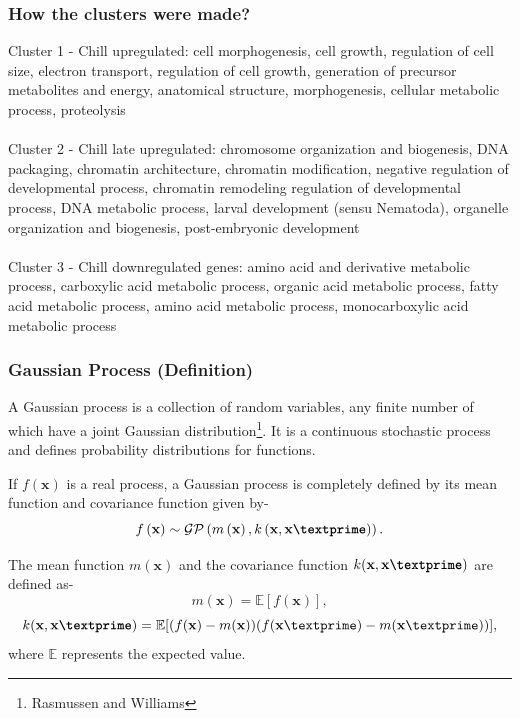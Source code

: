 \documentclass{beamer}
\begin{document}

\begin{frame}

\frametitle{How the clusters were made?}

{\color{red} Cluster 1} - {\color{blue} Chill upregulated:}  
cell morphogenesis, cell growth, regulation of cell size, electron transport, regulation of cell growth, generation of precursor metabolites and energy, anatomical structure,  morphogenesis, cellular metabolic process, proteolysis\\~\\

{\color{red}Cluster 2} - {\color{blue} Chill late upregulated:}
chromosome organization and biogenesis, DNA packaging, chromatin architecture, chromatin modification, negative regulation of developmental process, chromatin remodeling regulation of developmental process, DNA metabolic process, larval development (sensu Nematoda), organelle organization and biogenesis, post-embryonic development\\~\\

{\color{red} Cluster 3} - {\color{blue} Chill downregulated genes:} 
amino acid and derivative metabolic process, carboxylic acid metabolic process, organic acid metabolic process, fatty acid metabolic process, amino acid metabolic process, monocarboxylic acid metabolic process

\end{frame}

\begin{frame}
\frametitle{Gaussian Process (Definition)}
A Gaussian process is a collection of random variables, any finite number of which have a joint Gaussian distribution\footnote{Rasmussen and Williams}. It is a continuous stochastic process and defines probability distributions for functions.

If $f(\textbf{x})$ is a real process, a Gaussian process is completely defined by its mean function and covariance function given by-
\begin{equation} \label{eq:GP}
f\left(\textbf{x} \right)\sim \mathcal{GP} \left(m \left(\textbf{x}\right), k \left(\textbf{x},\textbf{x\textprime}\right) \right).
\end{equation}

The mean function $m(\textbf{x})$  and the covariance function $k(\textbf{x},\textbf{x\textprime})$ are defined as-
\begin{equation} \label{eq:2.3}
m(\textbf{x})= \mathbb{E}[f(\textbf{x})],
\end{equation}
\begin{equation} \label{eq:2.4}
k(\textbf{x},\textbf{x\textprime})= 
\mathbb{E}[(f(\textbf{x})-m(\textbf{x}))(f(\textbf{x}\textprime)-m(\textbf{x}\textprime))],
\end{equation}
where $\mathbb{E}$ represents the expected value.

\end{frame}
\end{document}
